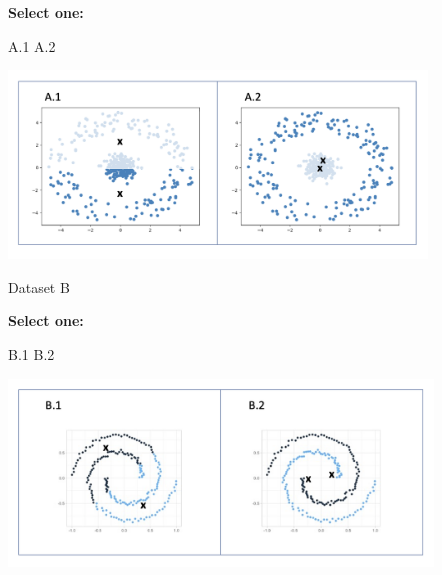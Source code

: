 \documentclass[11pt,addpoints,answers]{exam}
\newcommand{\sone}{\textbf{Select one: }}
\begin{document}
\begin{questions}
\begin{parts}
\begin{subparts}
\begin{minipage}{.2\textwidth}
    \sone
    
    \begin{checkboxes}
    \CorrectChoice A.1
    \choice A.2
    \end{checkboxes}
\end{minipage}
\begin{minipage}{.75\textwidth}
\includegraphics[width=.9\linewidth, height=5cm]{figures/4.1a.png}
\end{minipage}



\subpart[1] Dataset B

\begin{minipage}{.2\textwidth}
    \sone
    
    \begin{checkboxes}
    \CorrectChoice B.1
    \choice B.2
    \end{checkboxes}
\end{minipage}
\begin{minipage}{.75\textwidth}
\includegraphics[width=.9\linewidth, height=5cm]{figures/4.1b.png}
\end{minipage}

\end{subparts}

\vspace{1em}

\end{parts}
\end{questions}
\end{document}
